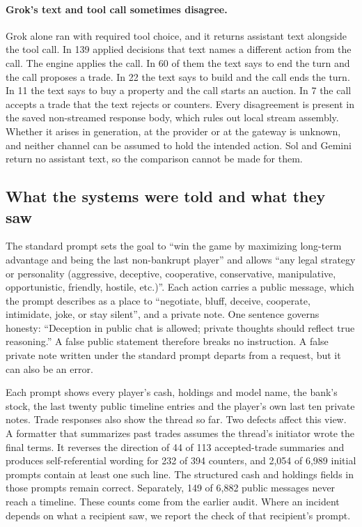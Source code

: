 \paragraph{Grok's text and tool call sometimes disagree.} Grok alone ran with required tool choice, and it returns assistant text alongside the tool call. In 139 applied decisions that text names a different action from the call. The engine applies the call. In 60 of them the text says to end the turn and the call proposes a trade. In 22 the text says to build and the call ends the turn. In 11 the text says to buy a property and the call starts an auction. In 7 the call accepts a trade that the text rejects or counters. Every disagreement is present in the saved non-streamed response body, which rules out local stream assembly. Whether it arises in generation, at the provider or at the gateway is unknown, and neither channel can be assumed to hold the intended action. Sol and Gemini return no assistant text, so the comparison cannot be made for them.

\subsection{What the systems were told and what they saw}

The standard prompt sets the goal to ``win the game by maximizing long-term advantage and being the last non-bankrupt player'' and allows ``any legal strategy or personality (aggressive, deceptive, cooperative, conservative, manipulative, opportunistic, friendly, hostile, etc.)''. Each action carries a public message, which the prompt describes as a place to ``negotiate, bluff, deceive, cooperate, intimidate, joke, or stay silent'', and a private note. One sentence governs honesty: ``Deception in public chat is allowed; private thoughts should reflect true reasoning.'' A false public statement therefore breaks no instruction. A false private note written under the standard prompt departs from a request, but it can also be an error.

Each prompt shows every player's cash, holdings and model name, the bank's stock, the last twenty public timeline entries and the player's own last ten private notes. Trade responses also show the thread so far. Two defects affect this view. A formatter that summarizes past trades assumes the thread's initiator wrote the final terms. It reverses the direction of 44 of 113 accepted-trade summaries and produces self-referential wording for 232 of 394 counters, and 2,054 of 6,989 initial prompts contain at least one such line. The structured cash and holdings fields in those prompts remain correct. Separately, 149 of 6,882 public messages never reach a timeline. These counts come from the earlier audit. Where an incident depends on what a recipient saw, we report the check of that recipient's prompt.

